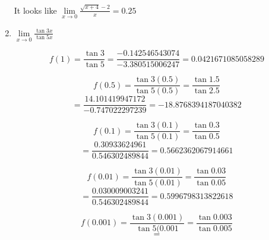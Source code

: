 \documentclass{article}
\begin{document}
\begin{enumerate}
			It looks like $\lim \limits _{x \to 0} \frac{\sqrt{x + 4} - 2}{x} = 0.25$
			
			\item $\lim \limits _{x \to 0} \frac{\tan 3x}{\tan 5x}$
			
			$$f(1) = \frac{\tan 3}{\tan 5} = \frac{-0.142546543074}{-3.380515006247} = 0.0421671085058289$$
			
			$$f(0.5) = \frac{\tan 3(0.5)}{\tan 5(0.5)} = \frac{\tan 1.5}{\tan 2.5} $$
			$$= \frac{14.101419947172}{-0.747022297239} = -18.8768394187040382$$
			
			$$f(0.1) = \frac{\tan 3(0.1)}{\tan 5(0.1)} = \frac{\tan 0.3}{\tan 0.5} $$
			$$ = \frac{0.30933624961}{0.546302489844} = 0.5662362067914661$$
			
			$$f(0.01) = \frac{\tan 3(0.01)}{\tan 5(0.01)} = \frac{\tan 0.03}{\tan 0.05}$$
			$$ = \frac{0.030009003241}{0.546302489844} = 0.5996798313822618$$
			
			$$f(0.001) = \frac{\tan 3(0.001)}{\tan 5(0.001} = \frac{\tan 0.003}{\tan 0.005}$$
			$$ = $$
	\end{enumerate}
\end{document}

